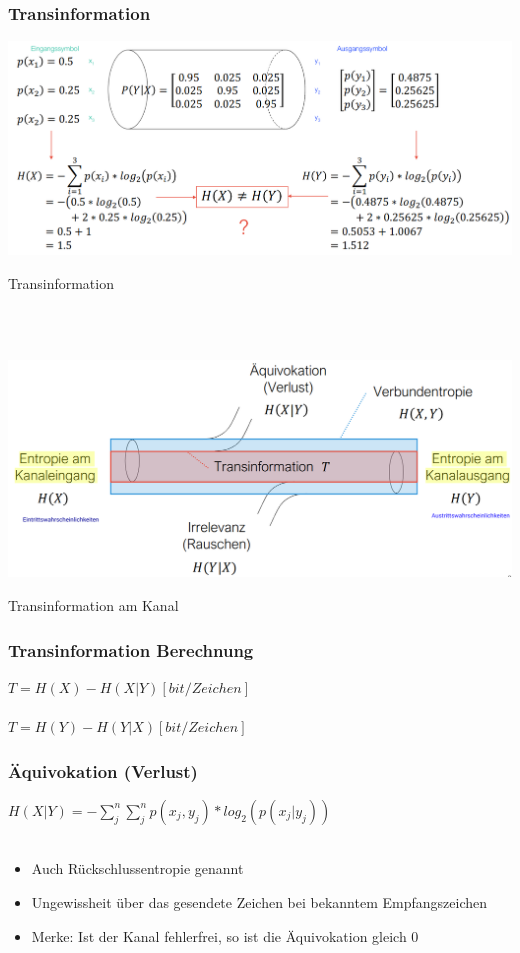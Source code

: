 \subsubsection{Transinformation}
\begin{minipage}[t]{0.9\textwidth}
	\centering
	\includegraphics[width=0.9\linewidth]{images/transinformation}
	\caption{Transinformation}
	\label{fig:transinformation}
\end{minipage}
\\
\\
\begin{minipage}[t]{0.9\textwidth}
	\centering
	\includegraphics[width=0.9\linewidth]{images/transinformationkanal}
	\caption{Transinformation am Kanal}
	\label{fig:transinformationkanal}
\end{minipage}
\subsubsection{Transinformation Berechnung}
$T=H(X)-H(X|Y)[bit/Zeichen]$ \\
\\
$T=H(Y)-H(Y|X)[bit/Zeichen]$

\subsubsection{Äquivokation (Verlust)}
$H(X|Y)=-\sum_j^n\sum_j^np(x_j,y_j)*log_2(p(x_j|y_j))$
\\
\\
\begin{itemize}
	\item Auch Rückschlussentropie genannt
	\item Ungewissheit über das gesendete Zeichen bei bekanntem Empfangszeichen
	\item Merke: Ist der Kanal fehlerfrei, so ist die Äquivokation gleich 0
\end{itemize}

